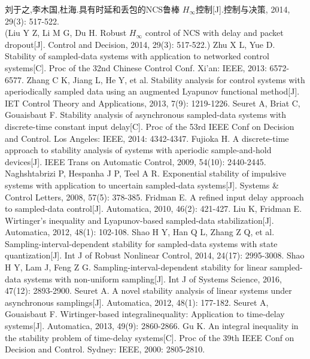 \documentclass{ctacn}%
\begin{document}
\begin{multicols}{2}
\begin{thebibliography}{99}
\addtolength{\itemsep}{-0.7em}
刘于之,李木国,杜海.\;具有时延和丢包的NCS鲁棒 $H_{\infty}$控制[J].\;控制与决策, 2014, 29(3): 517-522.\\
(Liu Y Z, Li M G, Du H. Robust $H_{\infty}$ control of NCS with delay and packet dropout[J]. Control and Decision, 2014, 29(3): 517-522.)
Zhu X L, Yue D. Stability of sampled-data systems with application to networked control systems[C]. Proc of the 32nd Chinese Control Conf. Xi'an: IEEE, 2013: 6572-6577.
Zhang C K, Jiang L, He Y, et al. Stability analysis for control systems with aperiodically sampled data using an augmented Lyapunov functional method[J]. IET Control Theory and Applications, 2013, 7(9): 1219-1226.
Seuret A, Briat C, Gouaisbaut F. Stability analysis of asynchronous sampled-data systems with discrete-time constant input delay[C]. Proc of the 53rd IEEE Conf on Decision and Control. Los Angeles: IEEE, 2014: 4342-4347.
Fujioka H. A discrete-time approach to stability analysis of systems with aperiodic sample-and-hold devices[J]. IEEE Trans on Automatic Control, 2009, 54(10): 2440-2445.
Naghshtabrizi P, Hespanha J P, Teel A R. Exponential stability of impulsive systems with application to uncertain sampled-data systems[J].  Systems \&  Control Letters, 2008, 57(5): 378-385.
Fridman E. A refined input delay approach to sampled-data control[J].  Automatica, 2010, 46(2): 421-427.
Liu K, Fridman E. Wirtinger's inequality and Lyapunov-based sampled-data stabilization[J].  Automatica, 2012, 48(1): 102-108.
Shao H Y, Han Q L, Zhang Z Q, et al. Sampling-interval-dependent stability for sampled-data systems with state quantization[J].  Int J of Robust Nonlinear Control, 2014, 24(17): 2995-3008.
Shao H Y, Lam J, Feng Z G. Sampling-interval-dependent stability for linear sampled-data systems with non-uniform sampling[J]. Int J of Systems Science, 2016, 47(12): 2893-2900.
Seuret A. A novel stability analysis of linear systems under asynchronous samplings[J]. Automatica, 2012, 48(1): 177-182.
Seuret A, Gouaisbaut F. Wirtinger-based integral\linebreak     inequality: Application to time-delay systems[J]. Automatica, 2013, 49(9): 2860-2866.
Gu K. An integral inequality in the stability problem of time-delay systems[C]. Proc of the 39th IEEE Conf on Decision and Control. Sydney: IEEE, 2000: 2805-2810.

\end{thebibliography}\vspace{-20pt}
\end{multicols}
\end{document}
